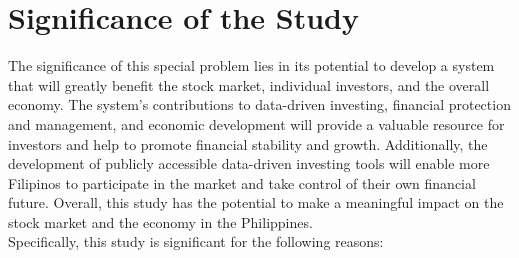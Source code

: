 \section{Significance of the Study}
\label{sec:significance}
The significance of this special problem lies in its potential to develop a 
system that will greatly benefit the stock market, individual investors, and 
the overall economy. The system's contributions to data-driven investing, 
financial protection and management, and economic development will provide 
a valuable resource for investors and help to promote financial stability and growth. 
Additionally, the development of publicly accessible data-driven investing tools 
will enable more Filipinos to participate in the market and take control of their 
own financial future. Overall, this study has the potential to make a meaningful 
impact on the stock market and the economy in the Philippines.
\vspace{0.5cm}
\\Specifically, this study is significant for the following reasons:
